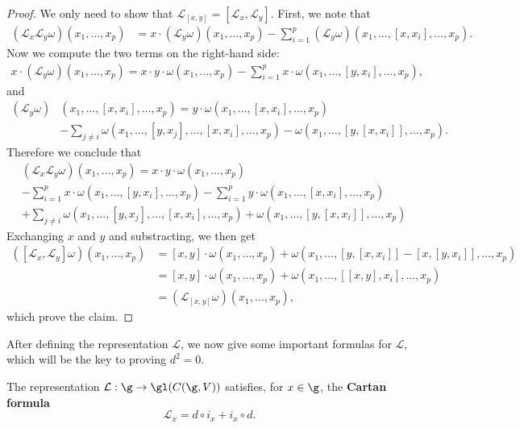 \begin{proof}
We only need to show that $\mathcal{L}_{[x,y]}=[\mathcal{L}_x,\mathcal{L}_y]$. First, we note that
\begin{align*}
(\mathcal{L}_x\mathcal{L}_y\omega)(x_1,\dots,x_p)&=x\cdot(\mathcal{L}_y\omega)(x_1,\dots,x_p)-\sum_{i=1}^{p}(\mathcal{L}_y\omega)(x_1,\dots,[x,x_i],\dots,x_p).
\end{align*}
Now we compute the two terms on the right-hand side:
\begin{align*}
x\cdot(\mathcal{L}_y\omega)(x_1,\dots,x_p)=x\cdot y\cdot\omega(x_1,\dots,x_p)-\sum_{i=1}^{p}x\cdot\omega(x_1,\dots,[y,x_i],\dots,x_p),
\end{align*}
and
\begin{align*}
(\mathcal{L}_y\omega)&(x_1,\dots,[x,x_i],\dots,x_p)=y\cdot\omega(x_1,\dots,[x,x_i],\dots,x_p)\\
&-\sum_{j\neq i}\omega(x_1,\dots,[y,x_j],\dots,[x,x_i],\dots,x_p)-\omega(x_1,\dots,[y,[x,x_i]],\dots,x_p).
\end{align*}
Therefore we conclude that
\begin{equation*}\scriptstyle
\begin{aligned}
&(\mathcal{L}_x\mathcal{L}_y\omega)(x_1,\dots,x_p)=x\cdot y\cdot\omega(x_1,\dots,x_p)\\
&-\sum_{i=1}^{p}x\cdot\omega(x_1,\dots,[y,x_i],\dots,x_p)-\sum_{i=1}^{p}y\cdot\omega(x_1,\dots,[x,x_i],\dots,x_p)\\
&+\sum_{j\neq i}\omega(x_1,\dots,[y,x_j],\dots,[x,x_i],\dots,x_p)+\omega(x_1,\dots,[y,[x,x_i]],\dots,x_p)
\end{aligned}
\end{equation*}
Exchanging $x$ and $y$ and substracting, we then get
\begin{align*}
([\mathcal{L}_x,\mathcal{L}_y]\omega)(x_1,\dots,x_p)&=[x,y]\cdot\omega(x_1,\dots,x_p)+\omega(x_1,\dots,[y,[x,x_i]]-[x,[y,x_i]],\dots,x_p)\\
&=[x,y]\cdot\omega(x_1,\dots,x_p)+\omega(x_1,\dots,[[x,y],x_i],\dots,x_p)\\
&=(\mathcal{L}_{[x,y]}\omega)(x_1,\dots,x_p),
\end{align*}
which prove the claim.
\end{proof}
After defining the representation $\mathcal{L}$, we now give some important formulas for $\mathcal{L}$, which will be the key to proving $d^2=0$.
\begin{proposition}
The representation $\mathcal{L}:\g\to\gl(C(\g,V))$ satisfies, for $x\in\g$, the \textbf{Cartan formula}
\[\mathcal{L}_x=d\circ i_x+i_x\circ d.\]
\end{proposition}
